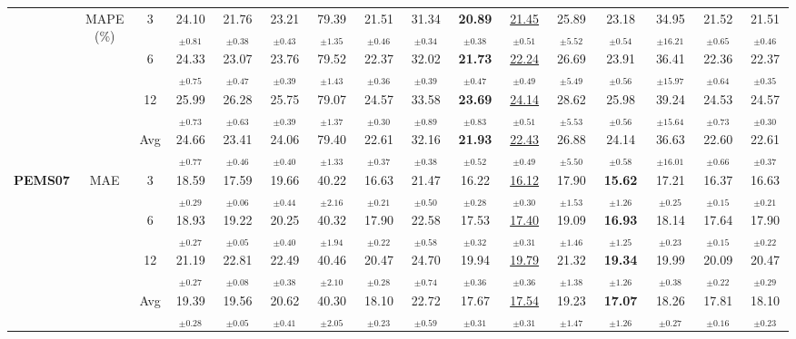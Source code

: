 \begin{table}[t]
{\begin{tabular}{ccc|ccc|cccc|cccc|cc}
\cmidrule(lr){2-16}
 & \multirow{4}{*}{MAPE (\%)} & 3 & 24.10$_{\pm0.81}$ & 21.76$_{\pm0.38}$ & 23.21$_{\pm0.43}$ & 79.39$_{\pm1.35}$ & 21.51$_{\pm0.46}$ & 31.34$_{\pm0.34}$ & \textbf{20.89$_{\pm0.38}$} & \underline{21.45$_{\pm0.51}$} & 25.89$_{\pm5.52}$ & 23.18$_{\pm0.54}$ & 34.95$_{\pm16.21}$ & 21.52$_{\pm0.65}$ & 21.51$_{\pm0.46}$ \\
 &  & 6 & 24.33$_{\pm0.75}$ & 23.07$_{\pm0.47}$ & 23.76$_{\pm0.39}$ & 79.52$_{\pm1.43}$ & 22.37$_{\pm0.36}$ & 32.02$_{\pm0.39}$ & \textbf{21.73$_{\pm0.47}$} & \underline{22.24$_{\pm0.49}$} & 26.69$_{\pm5.49}$ & 23.91$_{\pm0.56}$ & 36.41$_{\pm15.97}$ & 22.36$_{\pm0.64}$ & 22.37$_{\pm0.35}$ \\
 &  & 12 & 25.99$_{\pm0.73}$ & 26.28$_{\pm0.63}$ & 25.75$_{\pm0.39}$ & 79.07$_{\pm1.37}$ & 24.57$_{\pm0.30}$ & 33.58$_{\pm0.89}$ & \textbf{23.69$_{\pm0.83}$} & \underline{24.14$_{\pm0.51}$} & 28.62$_{\pm5.53}$ & 25.98$_{\pm0.56}$ & 39.24$_{\pm15.64}$ & 24.53$_{\pm0.73}$ & 24.57$_{\pm0.30}$ \\
 &  & Avg & 24.66$_{\pm0.77}$ & 23.41$_{\pm0.46}$ & 24.06$_{\pm0.40}$ & 79.40$_{\pm1.33}$ & 22.61$_{\pm0.37}$ & 32.16$_{\pm0.38}$ & \textbf{21.93$_{\pm0.52}$} & \underline{22.43$_{\pm0.49}$} & 26.88$_{\pm5.50}$ & 24.14$_{\pm0.58}$ & 36.63$_{\pm16.01}$ & 22.60$_{\pm0.66}$ & 22.61$_{\pm0.37}$ \\
\midrule
\multirow{12}{*}{\textbf{PEMS07}} & \multirow{4}{*}{MAE} & 3 & 18.59$_{\pm0.29}$ & 17.59$_{\pm0.06}$ & 19.66$_{\pm0.44}$ & 40.22$_{\pm2.16}$ & 16.63$_{\pm0.21}$ & 21.47$_{\pm0.50}$ & 16.22$_{\pm0.28}$ & \underline{16.12$_{\pm0.30}$} & 17.90$_{\pm1.53}$ & \textbf{15.62$_{\pm1.26}$} & 17.21$_{\pm0.25}$ & 16.37$_{\pm0.15}$ & 16.63$_{\pm0.21}$ \\
 &  & 6 & 18.93$_{\pm0.27}$ & 19.22$_{\pm0.05}$ & 20.25$_{\pm0.40}$ & 40.32$_{\pm1.94}$ & 17.90$_{\pm0.22}$ & 22.58$_{\pm0.58}$ & 17.53$_{\pm0.32}$ & \underline{17.40$_{\pm0.31}$} & 19.09$_{\pm1.46}$ & \textbf{16.93$_{\pm1.25}$} & 18.14$_{\pm0.23}$ & 17.64$_{\pm0.15}$ & 17.90$_{\pm0.22}$ \\
 &  & 12 & 21.19$_{\pm0.27}$ & 22.81$_{\pm0.08}$ & 22.49$_{\pm0.38}$ & 40.46$_{\pm2.10}$ & 20.47$_{\pm0.28}$ & 24.70$_{\pm0.74}$ & 19.94$_{\pm0.36}$ & \underline{19.79$_{\pm0.36}$} & 21.32$_{\pm1.38}$ & \textbf{19.34$_{\pm1.26}$} & 19.99$_{\pm0.38}$ & 20.09$_{\pm0.22}$ & 20.47$_{\pm0.29}$ \\
 &  & Avg & 19.39$_{\pm0.28}$ & 19.56$_{\pm0.05}$ & 20.62$_{\pm0.41}$ & 40.30$_{\pm2.05}$ & 18.10$_{\pm0.23}$ & 22.72$_{\pm0.59}$ & 17.67$_{\pm0.31}$ & \underline{17.54$_{\pm0.31}$} & 19.23$_{\pm1.47}$ & \textbf{17.07$_{\pm1.26}$} & 18.26$_{\pm0.27}$ & 17.81$_{\pm0.16}$ & 18.10$_{\pm0.23}$ \\

\end{tabular}}
\end{table}
